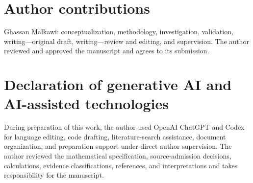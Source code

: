 \documentclass[11pt]{article}
\begin{document}
\section*{Author contributions}

Ghassan Malkawi: conceptualization, methodology, investigation, validation, writing—original draft, writing—review and editing, and supervision. The author reviewed and approved the manuscript and agrees to its submission.

\section*{Declaration of generative AI and AI-assisted technologies}

During preparation of this work, the author used OpenAI ChatGPT and Codex for language editing, code drafting, literature-search assistance, document organization, and preparation support under direct author supervision. The author reviewed the mathematical specification, source-admission decisions, calculations, evidence classifications, references, and interpretations and takes responsibility for the manuscript.
\end{document}

